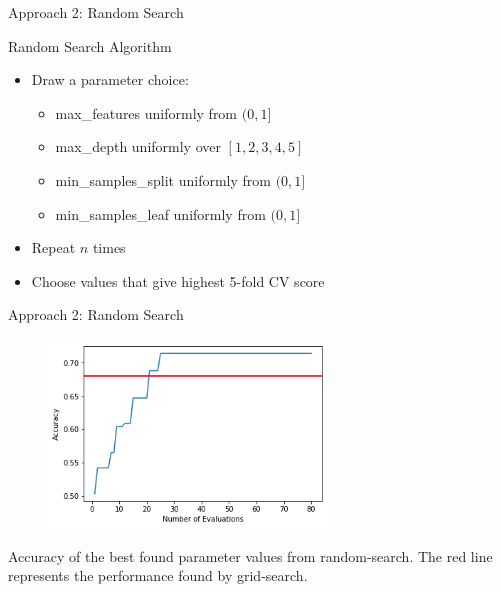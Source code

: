 \documentclass{beamer}
\begin{document}
\begin{frame}{Approach 2: Random Search}
		\begin{block}{Random Search Algorithm}
		\begin{itemize}
			\item Draw a parameter choice:
			\begin{itemize}
				\item max\_features uniformly from $(0,1]$
				\item max\_depth uniformly over $[1,2,3,4,5]$
				\item min\_samples\_split uniformly from $(0,1]$
				\item min\_samples\_leaf uniformly from $(0,1]$
			\end{itemize}
			\item Repeat $n$ times
			\item Choose values that give highest 5-fold CV score
		\end{itemize}
	\end{block}
\end{frame}
\begin{frame}{Approach 2: Random Search}

\begin{block}{}
			\begin{figure}[h]
		\begin{center}
			\includegraphics[height=5cm]{single_random}
		\end{center}
	\end{figure}
	Accuracy of the best found parameter values from random-search. The red line represents the performance found by grid-search.
\end{block}
\end{frame}
\end{document}
